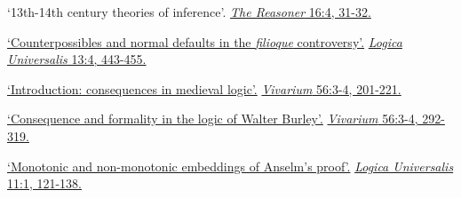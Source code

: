 	\item {}
{
	`13th-14th century theories of inference'. \href{http://blogs.kent.ac.uk/thereasoner/files/2022/05/TheReasoner-164.pdf}{\emph{The Reasoner} 16:4, 31-32.}
}
{}	
\item {}
{%
	\href{https://www.academia.edu/41385588/Counterpossibles_and_Normal_Defaults_in_the_Filioque_Controversy}{`Counterpossibles and normal defaults in the \emph{filioque} controversy'.} \href{https://link.springer.com/article/10.1007\%2Fs11787-019-00229-x}{\emph{Logica Universalis} 13:4, 443-455.}
}
{}
	\item {}
{}
{
	\href{https://www.academia.edu/38134285/Introduction_Consequences_in_Medieval_Logic}{`Introduction: consequences in medieval logic'.} \href{https://brill.com/view/journals/viv/56/3-4/article-p201_1.xml?language=en}{\emph{Vivarium} 56:3-4, 201-221.}}
{}
	\item \datedsubsectionnarrow{}
{}
{
	\href{https://www.academia.edu/38134091/Consequence_and_formality_in_the_logic_of_Walter_Burley}{`Consequence and formality in the logic of Walter Burley'.} \href{https://brill.com/view/journals/viv/56/3-4/article-p292_5.xml?language=en}{\emph{Vivarium} 56:3-4, 292-319.}}
{}
	\item {}
{}
{
	\href{https://www.academia.edu/29444391/Monotonic_and_non_monotonic_embeddings_of_Anselms_proof}{`Monotonic and non-monotonic embeddings of Anselm's proof'.} \href{https://link.springer.com/article/10.1007/s11787-017-0162-7}{\emph{Logica Universalis} 11:1, 121-138.}}
{}
